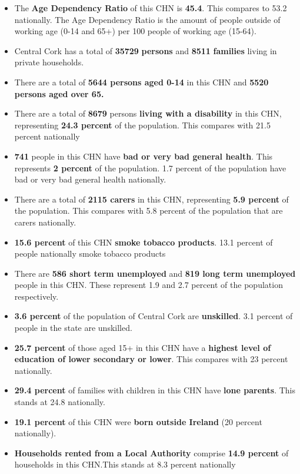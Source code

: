 \documentclass{article}
\begin{document}
\begin{itemize}

\item The \textbf{Age Dependency Ratio} of this CHN is  \textbf{45.4}. This compares to 53.2 nationally. The Age Dependency Ratio is the amount of people outside of working age (0-14 and 65+) per 100 people of working age (15-64). 

\item Central Cork has a total of \textbf{\num{35729}} \textbf{persons} and  \textbf{\num{8511}} \textbf{families} living in private households.

\item There are a total of \textbf{\num{5644} persons aged 0-14} in this CHN and \textbf{\num{5520} persons aged over 65.} 

\item There are a total of \textbf{\num{8679}} persons \textbf{living with a disability} in this CHN, representing \textbf{24.3 percent} of the population. This compares with  21.5 percent nationally

\item \textbf{\num{741}} people in this CHN have \textbf{bad or very bad general health}. This represents \textbf{2 percent} of the population. 1.7 percent of the population have bad or very bad general health nationally. 

\item There are a total of \textbf{\num{2115} carers} in this CHN, representing \textbf{5.9 percent} of the population. This compares with 5.8 percent of the population that are carers nationally. 

\item \textbf{15.6 percent} of this CHN \textbf{smoke tobacco products}. 13.1 percent of people nationally smoke tobacco products

\item There are \textbf{\num{586} short term unemployed} and \textbf{\num{819} long term unemployed} people in this CHN. These represent 1.9 and 2.7 percent of the population respectively.

\item  \textbf{3.6 percent} of the population of Central Cork are \textbf{unskilled}. 3.1 percent of people in the state are unskilled.

\item \textbf{25.7 percent} of those aged 15+ in this CHN have a \textbf{highest level of education of lower secondary or lower}. This compares with 23 percent nationally. 

\item \textbf{29.4 percent} of families with children in this CHN have \textbf{lone parents}. This stands at 24.8 nationally.

\item \textbf{19.1 percent} of this CHN were \textbf{born outside Ireland} (20 percent nationally).

\item \textbf{Households rented from a Local Authority} comprise \textbf{14.9 percent} of households in this CHN.This stands at 8.3 percent nationally

\end{itemize}
\end{document}
